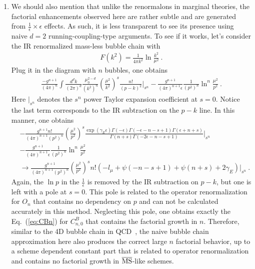 \documentclass[a4paper,11pt]{article}
\begin{document}
\begin{enumerate}
    The situation is different from marginal theory: as least based on lessons from large-$N$ expansion~\cite{David:1982qv,David:1983gz,David:1985xj,Beneke:1998eq,Marino:2024uco,Liu:2024omb}, in asymptotically free theories there are ambiguities to define high-dimensional operators, but these ambiguities can be resolved easily in an ``one-for-all'' manner using a Borel prescription. Once the Borel prescription has been fixed, there are no further factorial enhancements of ``high-twist'' operators. 
   \item We should also mention that unlike the renormalons in marginal theories, the factorial enhancements observed here are rather subtle and are generated from $\frac{1}{\epsilon} \times \epsilon$ effects. As such, it is less transparent to see its presence using naive $d=2$ running-coupling-type arguments. To see if it works, let's consider the IR renormalized mass-less bubble chain with 
   \begin{align}
   F(k^2)=\frac{1}{4\pi k^2}\ln\frac{k^2}{\mu^2} \ .
   \end{align}
   Plug it in the diagram with $n$ bubbles, one obtains
   \begin{align}
   \frac{-g^{n+1}}{(4\pi)^n}\int \frac{d^dk}{(2\pi)^d}\frac{\mu_0^{2-d}}{(k^2)^n}\left(\frac{\mu^2}{k^2}\right)^s\frac{n!}{(p-k)^2}\bigg|_{s^n}-\frac{g^{n+1}}{(4\pi)^{n+1} \epsilon}\frac{1}{(p^2)^{n}}\ln^n\frac{\mu^2}{p^2} \ .
   \end{align}
   Here $|_{s^n}$ denotes the $s^n$ power Taylor expansion coefficient at $s=0$. Notice the last term corresponds to the IR subtraction on the $p-k$ line. In this manner, one obtains
   \begin{align}
&-\frac{g^{n+1}n!}{(4\pi)^{n+1}(p^2)^n}\left(\frac{
\mu^2
}{p^2}\right)^s\frac{\exp (\gamma_E \epsilon) \Gamma (-\epsilon) \Gamma (-\epsilon-n-s+1) \Gamma (\epsilon+n+s)}{\Gamma (n+s) \Gamma (-2 \epsilon-n-s+1)}\bigg|_{s^n} \nonumber \\ 
&-\frac{g^{n+1}}{(4\pi)^{n+1} \epsilon}\frac{1}{(p^2)^{n}}\ln^n\frac{\mu^2}{p^2} \nonumber \\ 
& \rightarrow \frac{g^{n+1}}{(4\pi)^{n+1}(p^2)^n}\left(\frac{\mu^2}{p^2}\right)^s n!\left(-l_{\mu}+\psi (-n-s+1)+\psi(n+s)+2 \gamma_E \right) \bigg|_{s^n}\ .
   \end{align}
   Again, the $\ln p$ in the $\frac{1}{\epsilon}$ is removed by the IR subtraction on $p-k$, but one is left with a pole at $s=0$. This pole is related to the operator renormalization for $O_n$ that contains no dependency on $p$ and can not be calculated accurately in this method. Neglecting this pole, one obtains exactly the Eq.~(\ref{eq:CBn}) for $C_{n,0}^B$ that contains the factorial growth in $n$. Therefore, similar to the 4D bubble chain in QCD~\cite{Beneke:1998ui}, the naive bubble chain approximation here also produces the correct large $n$ factorial behavior, up to a scheme dependent constant part  that is related to operator renormalization and contains no factorial growth in $\overline{\rm MS}$-like schemes. 


\end{enumerate}
\end{document}
